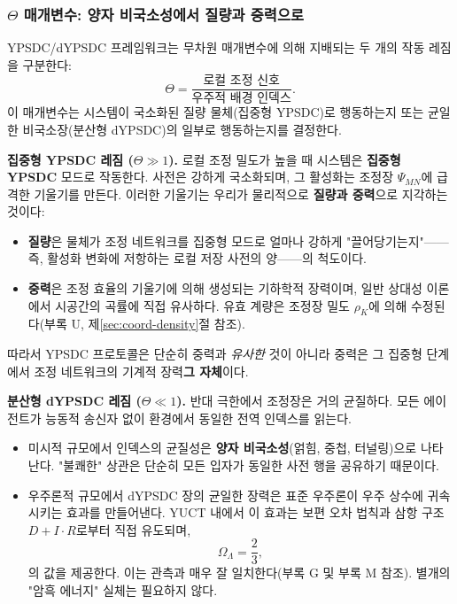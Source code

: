\documentclass[12pt,a4paper]{article}
\begin{document}
	\medskip
	
	\subsubsection{$\Theta$ 매개변수: 양자 비국소성에서 질량과 중력으로}
	\label{subsec:theta-mass-gravity}
	
	YPSDC/dYPSDC 프레임워크는 무차원 매개변수에 의해 지배되는 두 개의 작동 레짐을 구분한다:
	\begin{equation}
		\Theta = \frac{\text{로컬 조정 신호}}{\text{우주적 배경 인덱스}}.
	\end{equation}
	이 매개변수는 시스템이 국소화된 질량 물체(집중형 YPSDC)로 행동하는지 또는 균일한 비국소장(분산형 dYPSDC)의 일부로 행동하는지를 결정한다.
	
	\textbf{집중형 YPSDC 레짐 ($\Theta \gg 1$).}
	로컬 조정 밀도가 높을 때 시스템은 \textbf{집중형 YPSDC} 모드로 작동한다. 사전은 강하게 국소화되며, 그 활성화는 조정장 $\Psi_{MN}$에 급격한 기울기를 만든다. 이러한 기울기는 우리가 물리적으로 \textbf{질량과 중력}으로 지각하는 것이다:
	
	\begin{itemize}
		\item \textbf{질량}은 물체가 조정 네트워크를 집중형 모드로 얼마나 강하게 "끌어당기는지"——즉, 활성화 변화에 저항하는 로컬 저장 사전의 양——의 척도이다.
		\item \textbf{중력}은 조정 효율의 기울기에 의해 생성되는 기하학적 장력이며, 일반 상대성 이론에서 시공간의 곡률에 직접 유사하다. 유효 계량은 조정장 밀도 $\rho_K$에 의해 수정된다(부록 U, 제\ref{sec:coord-density}절 참조).
	\end{itemize}
	
	따라서 YPSDC 프로토콜은 단순히 중력과 \emph{유사한} 것이 아니라 중력은 그 집중형 단계에서 조정 네트워크의 기계적 장력\textbf{그 자체}이다.
	
	\textbf{분산형 dYPSDC 레짐 ($\Theta \ll 1$).}
	반대 극한에서 조정장은 거의 균질하다. 모든 에이전트가 능동적 송신자 없이 환경에서 동일한 전역 인덱스를 읽는다.
	\begin{itemize}
		\item 미시적 규모에서 인덱스의 균질성은 \textbf{양자 비국소성}(얽힘, 중첩, 터널링)으로 나타난다. "불쾌한" 상관은 단순히 모든 입자가 동일한 사전 행을 공유하기 때문이다.
		\item 우주론적 규모에서 dYPSDC 장의 균일한 장력은 표준 우주론이 우주 상수에 귀속시키는 효과를 만들어낸다. YUCT 내에서 이 효과는 보편 오차 법칙과 삼항 구조 $D+I\!\cdot\!R$로부터 직접 유도되며,
		\[
		\Omega_{\Lambda} = \frac{2}{3},
		\]
		의 값을 제공한다. 이는 관측과 매우 잘 일치한다(부록 G 및 부록 M 참조). 별개의 "암흑 에너지" 실체는 필요하지 않다.
	\end{itemize}
	
\end{document}
